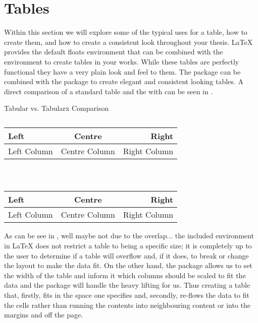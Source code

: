 	\section{Tables}
		Within this section we will explore some of the typical uses for a table, how to create them, and how to create a consistent look throughout your thesis.
		\LaTeX{} provides the default floats environment  that can be combined with the  environment to create tables in your works. 
		While these tables are perfectly functional they have a very plain look and feel to them.
		The package  can be combined with the  package to create elegant and consistent looking tables.
		A direct comparison of a standard table and the  with  can be seen in .
		\begin{table}[H]
			\caption{Tabular vs. Tabularx Comparison}
			\label{tab:tableComparison}
			\centering
			\begin{subtable}{0.45\textwidth}
				\caption{}
				\label{tab:tableComparison:b}
				\begin{tabular}{lcr} 
					\hline
						\textbf{Left} & \textbf{Centre} & \textbf{Right}\\%
					\hline
						Left Column & Centre Column & Right Column \\%
					\hline
				\end{tabular}
			\end{subtable}
			~
			\begin{subtable}{0.45\textwidth}
				\caption{}
				\label{tab:tableComparison:a}
				\begin{tabularx}{\textwidth}{LCR} 
					\toprule
						\textbf{Left} & \textbf{Centre} & \textbf{Right}\\
					\midrule
						Left Column & Centre Column & Right Column \\
					\bottomrule
				\end{tabularx}
			\end{subtable}
		\end{table}
		As can be see in , well maybe not due to the overlap... the included  environment in \LaTeX{} does not restrict a table to being a specific size; it is completely up to the user to determine if a table will overflow and, if it does, to break or change the layout to make the data fit.
		On the other hand, the  package allows us to set the width of the table and inform it which columns should be scaled to fit the data and the  package will handle the heavy lifting for us.
		Thus creating a table that, firstly, fits in the space one specifies and, secondly, re-flows the data to fit the cells rather than running the contents into neighbouring content or into the margins and off the page.
  
